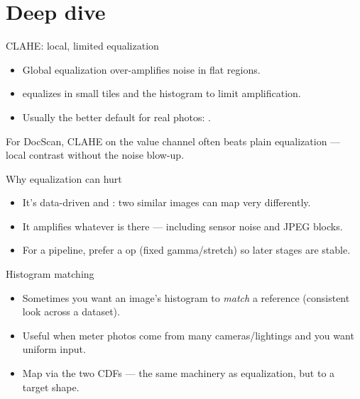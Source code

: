 \documentclass[10pt,aspectratio=169]{beamer}
\begin{document}
\section{Deep dive}

\begin{frame}{CLAHE: local, limited equalization}
  \begin{itemize}
    \item Global equalization over-amplifies noise in flat regions.
    \item {} equalizes in small tiles and  the histogram to limit amplification.
    \item Usually the better default for real photos: .
  \end{itemize}
  \begin{goodbox}
    For DocScan, CLAHE on the value channel often beats plain equalization — local contrast without the noise blow-up.
  \end{goodbox}
\end{frame}

\begin{frame}{Why equalization can hurt}
  \begin{itemize}
    \item It's data-driven and : two similar images can map very differently.
    \item It amplifies whatever is there — including sensor noise and JPEG blocks.
    \item For a pipeline, prefer a  op (fixed gamma/stretch) so later stages are stable.
  \end{itemize}
\end{frame}

\begin{frame}{Histogram matching}
  \begin{itemize}
    \item Sometimes you want an image's histogram to \emph{match} a reference (consistent look across a dataset).
    \item Useful when meter photos come from many cameras/lightings and you want uniform input.
    \item Map via the two CDFs — the same machinery as equalization, but to a target shape.
  \end{itemize}
\end{frame}
\end{document}
